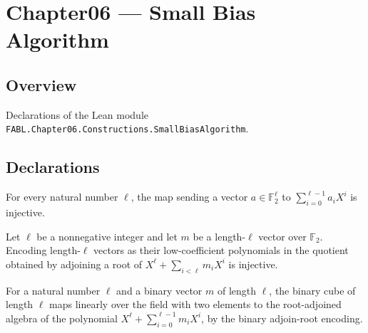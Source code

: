 \chapter{Chapter06 — Small Bias Algorithm}
\section{Overview}

Declarations of the Lean module \texttt{FABL.Chapter06.Constructions.SmallBiasAlgorithm}.

\section{Declarations}

\begin{theorem}
\label{FABL.binaryLowPolynomial_injective}
\leanok
{}
For every natural number $\ell$, the map sending a vector $a\in\mathbb F_2^\ell$ to
$\sum_{i=0}^{\ell-1}a_iX^i$ is injective.
\end{theorem}

\begin{theorem}
\label{FABL.binaryAdjoinRootEncode_injective}
\leanok
{}
Let $\ell$ be a nonnegative integer and let $m$ be a length-$\ell$ vector over $\mathbb
F_2$. Encoding length-$\ell$ vectors as their low-coefficient polynomials in the
quotient obtained by adjoining a root of $X^\ell+\sum_{i<\ell}m_iX^i$ is injective.
\end{theorem}

\begin{definition}
\label{FABL.binaryAdjoinRootLinearMap}
\leanok
{}
For a natural number $\ell$ and a binary vector $m$ of length $\ell$, the binary cube of
length $\ell$ maps linearly over the field with two elements to the root-adjoined
algebra of the polynomial $X^\ell+\sum_{i=0}^{\ell-1}m_iX^i$, by the binary adjoin-root
encoding.
\end{definition}

